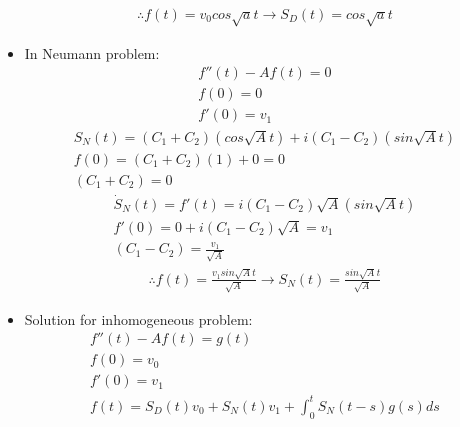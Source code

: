 \documentclass[12pt, a4paper]{article}
\begin{document}
\begin{itemize}
\begin{gather*}
        \therefore f(t) = v_0cos\sqrt{a}t \rightarrow S_D(t) = cos\sqrt{a}t
    \end{gather*}
    \item In Neumann problem:
    \begin{gather*}
        f''(t) - Af(t) = 0 \\
        f(0) = 0\\
        f'(0) = v_1
    \end{gather*}
    \begin{gather*}
        S_N(t) = (C_1 + C_2)(cos\sqrt{A}t) + i(C_1-C_2)(sin\sqrt{A}t) \\
        f(0) = (C_1 + C_2)(1) + 0 = 0\\
        (C_1 + C_2)= 0
    \end{gather*}
    \begin{gather*}
        \dot{S}_N(t)=f'(t) = i(C_1-C_2)\sqrt{A}(sin\sqrt{A}t) \\
        f'(0) = 0 + i(C_1-C_2)\sqrt{A} =v_1 \\
        (C_1-C_2) = \frac{v_1}{\sqrt{A}}
    \end{gather*}
    \begin{gather*}
        \therefore f(t) = \frac{v_1sin\sqrt{A}t}{\sqrt{A}} \rightarrow S_N(t) = \frac{sin\sqrt{A}t}{\sqrt{A}}
    \end{gather*}
    \item Solution for inhomogeneous problem:
    \begin{gather*}
        f''(t) - Af(t) = g(t) \\
        f(0) = v_0 \\
        f'(0) = v_1 \\
        f(t) = S_D(t)v_0 + S_N(t)v_1 + \int_0^tS_N(t-s)g(s)ds 
    \end{gather*}

\end{itemize}

\vspace{0.3em}
    
\end{document}
